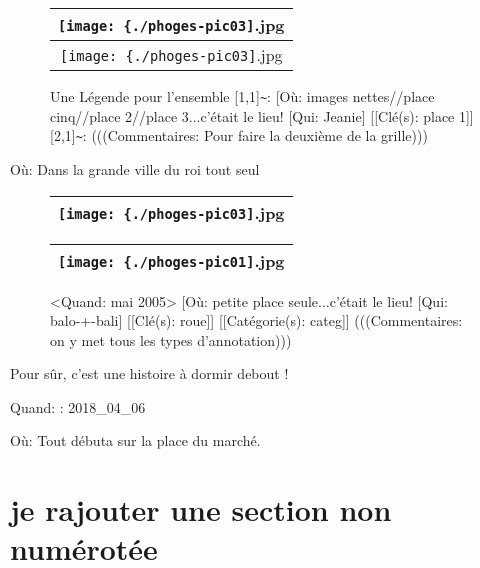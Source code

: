 \documentclass[12pt,twocolumn,french]{article}
\begin{document}
  \begin{figure}[H]
    \label{phoges-pic03.jpg}
    \noindent \centering{}
    \begin{tabular}{|c|}
      \hline
          \texttt{[image: \{./phoges-pic03]}.jpg}
        \tabularnewline \hline
          \texttt{[image: \{./phoges-pic03]}.jpg}
        \tabularnewline \hline
    \end{tabular}
    \vspace{2mm}
    \caption{
      Une Légende pour l'ensemble 
      [1,1]\texttt{\~{}}: 
       [Où: images nettes//place cinq//place 2//place 3...c'était le lieu!
       [Qui: Jeanie] 
      [[Clé(s): place 1]] 
      [2,1]\texttt{\~{}}: 
      (((Commentaires: Pour faire la deuxième de la grille)))
    }
  \end{figure}

Où: Dans la grande ville du roi tout seul

  \begin{figure}[H]
    \label{phoges-pic03.jpg}
    \noindent \centering{}
    \begin{tabular}{|c|}
      \hline
          \texttt{[image: \{./phoges-pic03]}.jpg}
        \tabularnewline \hline
    \end{tabular}
    \vspace{2mm}
    \caption{
    }
  \end{figure}
  \begin{figure}[H]
    \label{phoges-pic01.jpg}
    \noindent \centering{}
    \begin{tabular}{|c|}
      \hline
          \texttt{[image: \{./phoges-pic01]}.jpg}
        \tabularnewline \hline
    \end{tabular}
    \vspace{2mm}
    \caption{
      <Quand: mai 2005> 
       [Où: petite place seule...c'était le lieu!
       [Qui: balo-+-bali] 
      [[Clé(s): roue]] 
      [[Catégorie(s): categ]] 
      (((Commentaires: on y met tous les types d'annotation)))
    }
  \end{figure}

Pour sûr, c'est une histoire à dormir debout !


Quand: : 2018\_04\_06


Où: Tout débuta sur la place du marché.

 \section*{je rajouter une section non numérotée}
\end{document}
